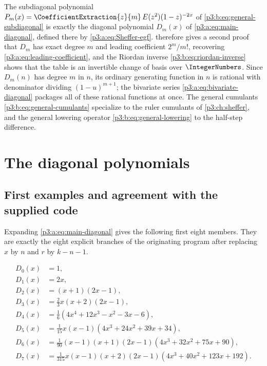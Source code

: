 \documentclass[11pt,oneside]{article}
\numberwithin{equation}{section}
\theoremstyle{definition}
\theoremstyle{remark}
\begin{document}
The subdiagonal polynomial $P_m(x)=\CoefficientExtraction{z}{m}\,{E(z^2)(1-z)^{-2x}}$ of
\eqref{p3:b:eq:general-subdiagonal} is exactly the diagonal polynomial
$D_m(x)$ of \eqref{p3:a:eq:main-diagonal}, defined there by
\eqref{p3:a:eq:Sheffer-egf}.  therefore
gives a second proof that $D_m$ has exact degree $m$ and leading
coefficient $2^m/m!$, recovering \eqref{p3:a:eq:leading-coefficient}, and the
Riordan inverse \eqref{p3:b:eq:riordan-inverse} shows that the table is an
invertible change of basis over $\IntegerNumbers$. Since $D_m(n)$ has degree $m$ in
$n$, its ordinary generating function in $n$ is rational with denominator
dividing $(1-u)^{m+1}$; the bivariate series \eqref{p3:a:eq:bivariate-diagonal}
packages all of these rational functions at once. The general cumulants
\eqref{p3:b:eq:general-cumulants} specialize to the ruler cumulants of
\cref{p3:ch:sheffer}, and the general lowering operator
\eqref{p3:b:eq:general-lowering} to the half-step difference.

\section{The diagonal polynomials}\label{p3:ch:diagonal}

\subsection{First examples and agreement with the supplied code}

Expanding \eqref{p3:a:eq:main-diagonal} gives the following first eight members.
They are exactly the eight explicit branches of the originating program after replacing
\(x\) by \(n\) and \(r\) by \(k-n-1\).

\begin{align}
 D_0(x)&=1,\label{p3:a:eq:D0}\\
 D_1(x)&=2x,\label{p3:a:eq:D1}\\
 D_2(x)&=(x+1)(2x-1),\label{p3:a:eq:D2}\\
 D_3(x)&=\frac{2}{3}x(x+2)(2x-1),\label{p3:a:eq:D3}\\
 D_4(x)&=\frac{1}{6}
 (4x^4+12x^3-x^2-3x-6),\label{p3:a:eq:D4}\\
 D_5(x)&=\frac{1}{15}x(x-1)
 (4x^3+24x^2+39x+34),\label{p3:a:eq:D5}\\
 D_6(x)&=\frac{1}{90}(x-1)(x+1)(2x-1)
 (4x^3+32x^2+75x+90),\label{p3:a:eq:D6}\\
 D_7(x)&=\frac{1}{315}x(x-1)(x+2)(2x-1)
 (4x^3+40x^2+123x+192).\label{p3:a:eq:D7}
\end{align}
\end{document}
